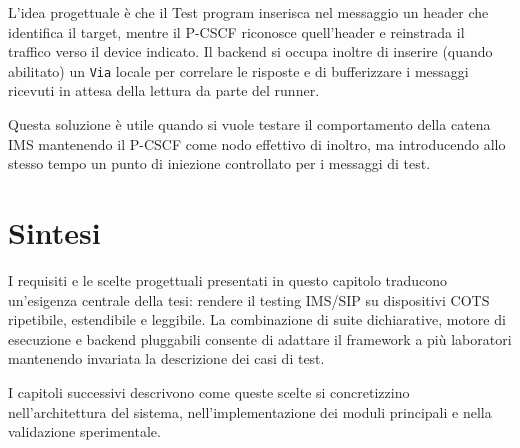 L'idea progettuale \`e che il Test program inserisca nel messaggio un header che identifica il target, mentre il P-CSCF riconosce quell'header e reinstrada il traffico verso il device indicato. Il backend si occupa inoltre di inserire (quando abilitato) un \texttt{Via} locale per correlare le risposte e di bufferizzare i messaggi ricevuti in attesa della lettura da parte del runner.

Questa soluzione \`e utile quando si vuole testare il comportamento della catena IMS mantenendo il P-CSCF come nodo effettivo di inoltro, ma introducendo allo stesso tempo un punto di iniezione controllato per i messaggi di test.

\section{Sintesi}
I requisiti e le scelte progettuali presentati in questo capitolo traducono un'esigenza centrale della tesi: rendere il testing IMS/SIP su dispositivi COTS ripetibile, estendibile e leggibile. La combinazione di suite dichiarative, motore di esecuzione e backend pluggabili consente di adattare il framework a pi\`u laboratori mantenendo invariata la descrizione dei casi di test.

I capitoli successivi descrivono come queste scelte si concretizzino nell'architettura del sistema, nell'implementazione dei moduli principali e nella validazione sperimentale.
